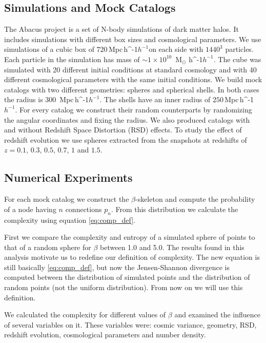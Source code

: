 \documentclass[fleqn,usenatbib]{mnras}
\newcommand{\Msunh}{\,{\rm M}$_{\odot}$\,\,\ifmmode h^{-1}\else $h^{-1}$\fi}
\newcommand{\Mpch}{\,{\rm Mpc}\,\ifmmode h^{-1}\else $h^{-1}$\fi}
\begin{document}
\subsection{Simulations and Mock Catalogs}
The Abacus project \citep{abacus} is a set of N-body simulations of dark matter halos. It includes simulations with different box sizes and cosmological parameters. We use simulations of a cubic box of $720$\Mpch on each side with $1440^3$ particles. Each particle in the simulation has mass of $\sim1\times10^{10}$ \Msunh. The cube was simulated with 20 different initial conditions at standard cosmology and with 40 different cosmological parameters with the same initial conditions.
We build mock catalogs with two different geometries: spheres and spherical shells. In both cases the radius is $300$ \Mpch. The shells have an inner radius of $250$\Mpch. For every catalog we construct their random counterparts by randomizing the angular coordinates and fixing the radius. We also produced catalogs with and without Redshift Space Distortion (RSD) effects. To study the effect of redshift evolution we use spheres extracted from the snapshots at redshifts of $z=0.1$, $0.3$, $0.5$, $0.7$, $1$ and $1.5$.




\subsection{Numerical Experiments}

For each mock catalog we construct the $\beta$-skeleton and compute the probability of a node having $n$ connections $p_n$. From this distribution we calculate the complexity using equation \ref{eq:comp_def}. 

First we compare the complexity and entropy of a simulated sphere of points to that of a random sphere for $\beta$ between 1.0 and 5.0. The results found in this analysis motivate us to redefine our definition of complexity. The new equation is still basically \ref{eq:comp_def}, but now the Jensen-Shannon divergence is computed between the distribution of simulated points and the distribution of random points (not the uniform distribution). From now on we will use this definition.

We calculated the complexity for different values of $\beta$ and examined the influence of several variables on it. These variables were: cosmic variance, geometry, RSD, redshift evolution, cosmological parameters and number density.
\end{document}
